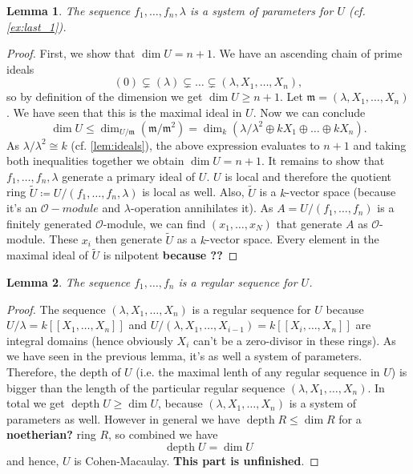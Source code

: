\documentclass{article}
\theoremstyle{plain}%
\newtheorem{lemma}{Lemma}[section]
\theoremstyle{definition}
\theoremstyle{remark}
\begin{document}
    \begin{lemma}
        The sequence \(f_1, \dots, f_n, \lambda\) is a system of parameters for \(U\) (cf. \cref{ex:last_1}).
    \end{lemma}
    \begin{proof}
        First, we show that \(\dim U = n + 1\).
        We have an ascending chain of prime ideals
        \[
            (0) \subsetneq (\lambda) \subsetneq \dots \subsetneq (\lambda, X_1, \dots, X_n),  
        \]
        so by definition of the dimension we get \(\dim U \geq n + 1\).
        Let \(\mathfrak{m} = (\lambda, X_1, \dots, X_n)\). We have seen that this is the maximal ideal in \(U\).
        Now we can conclude
        \[
            \dim U \leq \dim_{U/\mathfrak{m}}(\mathfrak{m}/\mathfrak{m}^2) 
            = \dim_k(\lambda/\lambda^2 \oplus k X_1 \oplus \dots \oplus k X_n).
        \]
        As \(\lambda/\lambda^2 \cong k\) (cf. \cref{lem:ideals}), the above expression evaluates to \(n+1\) and
        taking both inequalities together we obtain \(\dim U = n + 1\).
        It remains to show that \(f_1, \dots, f_n, \lambda\) generate a primary ideal of \(U\).
        \(U\) is local and therefore the quotient ring \(\tilde{U} \coloneqq U/(f_1, \dots, f_n, \lambda)\) 
        is local as well.
        Also, \(\tilde U\) is a \(k\)-vector space (because it's an \(\mathcal{O}-module\) and \(\lambda\)-operation
        annihilates it). As \(A = U/(f_1, \dots, f_n)\) is a finitely generated \(\mathcal{O}\)-module, we can find
        \((x_1, \dots, x_N)\) that generate \(A\) as \(\mathcal{O}\)-module.
        These \(x_i\) then generate \(\tilde U\) as a \(k\)-vector space.
        Every element in the maximal ideal of \(\tilde U\) is nilpotent \textbf{because ??}
    \end{proof}
    
    \begin{lemma}
        The sequence \(f_1, \dots, f_n\) is a regular sequence for \(U\).
    \end{lemma}
    \begin{proof}
        The sequence \((\lambda, X_1, \dots, X_n)\) is a regular sequence for \(U\) because
        \(U/\lambda = k[[X_1, \dots, X_n]]\) and \(U/(\lambda, X_1, \dots, X_{i-1}) = k[[X_i, \dots, X_n]]\) 
        are integral domains (hence obviously \(X_i\) can't be a zero-divisor in these rings).
        As we have seen in the previous lemma, it's as well a system of parameters.
        Therefore, the depth of \(U\) (i.e. the maximal lenth of any regular sequence in \(U\)) is bigger than
        the length of the particular regular sequence \((\lambda, X_1, \dots, X_n)\).
        In total we get \(\operatorname{depth} U \geq \dim U\), because \((\lambda, X_1, \dots, X_n)\) 
        is a system of parameters as well.
        However in general we have \(\operatorname{depth} R \leq \dim R\) for a \textbf{noetherian?} ring \(R\), 
        so combined we have
        \[
            \operatorname{depth} U = \dim U  
        \]
        and hence, \(U\) is Cohen-Macaulay.
        \textbf{This part is unfinished}.
    \end{proof}
\end{document}
